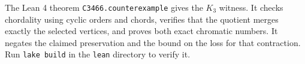 \documentclass[11pt]{article}
\begin{document}
The Lean 4 theorem \texttt{C3466.counterexample} gives the $K_3$ witness. It
checks chordality using cyclic orders and chords, verifies that the quotient
merges exactly the selected vertices, and proves both exact chromatic numbers.
It negates the claimed preservation and the bound on the loss for that
contraction. Run \texttt{lake build} in the \texttt{lean} directory to verify it.
\end{document}
